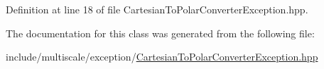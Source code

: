 Definition at line 18 of file Cartesian\-To\-Polar\-Converter\-Exception.\-hpp.



The documentation for this class was generated from the following file\-:\begin{DoxyCompactItemize}
\item 
include/multiscale/exception/\hyperlink{CartesianToPolarConverterException_8hpp}{Cartesian\-To\-Polar\-Converter\-Exception.\-hpp}\end{DoxyCompactItemize}
